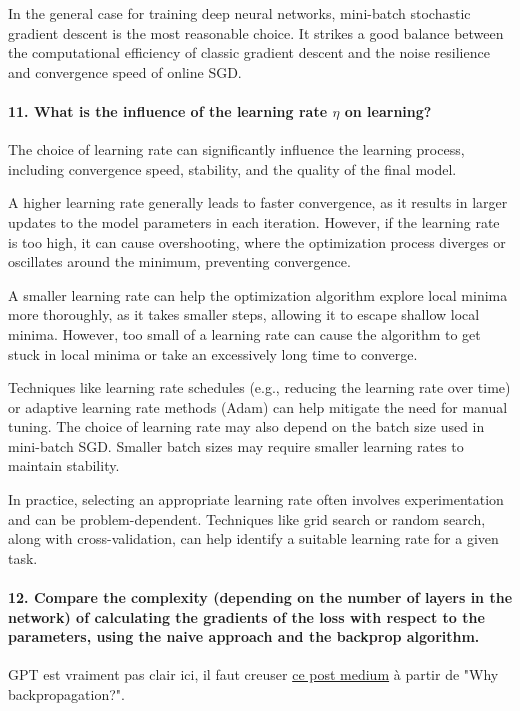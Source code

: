 \documentclass{article}
\theoremstyle{plain}%
\theoremstyle{definition}
\theoremstyle{remark}
\begin{document}
In the general case for training deep neural networks, mini-batch stochastic gradient descent is the most reasonable choice. It strikes a good balance between the computational efficiency of classic gradient descent and the noise resilience and convergence speed of online SGD.

\paragraph{11. What is the influence of the learning rate $ \eta  $  on learning?}
The choice of learning rate can significantly influence the learning process, including convergence speed, stability, and the quality of the final model. 

A higher learning rate generally leads to faster convergence, as it results in larger updates to the model parameters in each iteration. However, if the learning rate is too high, it can cause overshooting, where the optimization process diverges or oscillates around the minimum, preventing convergence.

A smaller learning rate can help the optimization algorithm explore local minima more thoroughly, as it takes smaller steps, allowing it to escape shallow local minima. However, too small of a learning rate can cause the algorithm to get stuck in local minima or take an excessively long time to converge.

Techniques like learning rate schedules (e.g., reducing the learning rate over time) or adaptive learning rate methods (Adam) can help mitigate the need for manual tuning. The choice of learning rate may also depend on the batch size used in mini-batch SGD. Smaller batch sizes may require smaller learning rates to maintain stability.

In practice, selecting an appropriate learning rate often involves experimentation and can be problem-dependent. Techniques like grid search or random search, along with cross-validation, can help identify a suitable learning rate for a given task.

\paragraph{12. Compare the complexity (depending on the number of layers in the network) of calculating the gradients of the loss with respect to the parameters, using the naive approach and the backprop algorithm.}
GPT est vraiment pas clair ici, il faut creuser \href{https://medium.com/spidernitt/breaking-down-neural-networks-an-intuitive-approach-to-backpropagation-3b2ff958794c}{ce post medium} à partir de "Why backpropagation?". 
\end{document}
